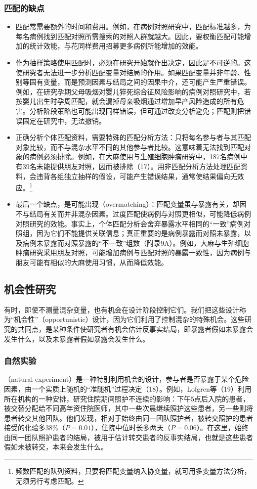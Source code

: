 \subsubsection{匹配的缺点}
\begin{itemize}
\item 匹配常需要额外的时间和费用。例如，在病例对照研究中，匹配标准越多，为每名病例找到匹配对照所需搜索的对照人群就越大。因此，要权衡匹配可能增加的统计效能，与花同样费用招募更多病例所能增加的效能。
\item 作为抽样策略使用匹配时，必须在研究开始就作出决定，因此是不可逆的。这使研究者无法进一步分析匹配变量对结局的作用。如果匹配变量并非年龄、性别等固有变量，而是预测因素与结局之间的因果中介，还可能产生严重错误。例如，在研究孕期父母吸烟对婴儿猝死综合征风险影响的病例对照研究中，若按婴儿出生时孕周匹配，就会漏掉母亲吸烟通过增加早产风险造成的所有危害。分析阶段策略也可能出现同样错误，但可通过改变分析避免；匹配则把错误固定在研究中，无法撤销。
\item 正确分析个体匹配资料，需要特殊的匹配分析方法：只将每名参与者与其匹配对象比较，而不与混杂水平不同的其他参与者比较。这意味着无法找到匹配对象的病例必须排除。例如，在大麻使用与生殖细胞肿瘤研究中，187名病例中有39名未能提供朋友对照，因而被排除（17）。用非匹配分析方法处理匹配资料，会违背各组独立抽样的假设，可能产生错误结果，通常使结果偏向无效应。\footnote{频数匹配的队列资料，只要将匹配变量纳入协变量，就可用多变量方法分析，无须另行考虑匹配。}
\item 最后一个缺点，是可能出现（overmatching）：匹配变量虽与暴露有关，却因不与结局有关而并非混杂因素。过度匹配使病例与对照更相似，可能降低病例对照研究的效能。事实上，个体匹配分析会舍弃暴露水平相同的“一致”病例对照组，因为它们不能提供关联信息；真正重要的是病例暴露而对照未暴露，以及病例未暴露而对照暴露的“不一致”组数（附录9A）。例如，大麻与生殖细胞肿瘤研究采用朋友对照，可能增加病例与匹配对照的暴露一致性，因为病例与朋友可能有相似的大麻使用习惯，从而降低效能。
\end{itemize}

\subsection{机会性研究}
有时，即使不测量混杂变量，也有机会在设计阶段控制它们。我们把这些设计称为“机会性”（opportunistic）设计，因为它们利用了控制混杂的特殊机会。这些研究的共同点，是某种条件使研究者有机会估计反事实结局，即暴露者假如未暴露会发生什么，以及未暴露者假如暴露会发生什么。

\subsubsection{自然实验}
（natural experiment）是一种特别利用机会的设计，参与者是否暴露于某个危险因素，由一个实质上随机的“准随机”过程决定（18）。例如，Lofgren等（19）利用所在机构的一种安排，研究住院期间照护不连续的影响：下午5点后入院的患者，被交替分配给不同高年资住院医师，其中一些次晨继续照护这些患者，另一些则将患者转交其他团队。他们发现，相对于始终由同一团队照护者，被转交照护的患者接受的化验多38\%（$P=0.01$），住院中位时长多两天（$P=0.06$）。在这里，始终由同一团队照护患者的结局，被用于估计转交患者的反事实结局，也就是这些患者假如未被转交，本来会发生什么。

